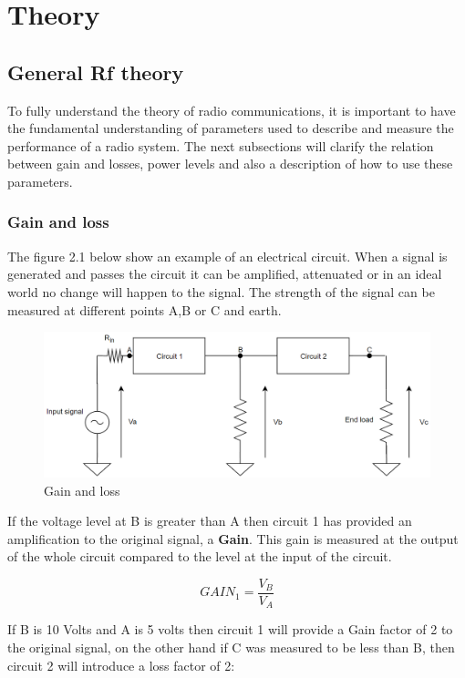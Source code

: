 \chapter{Theory}

\section{General Rf theory}
To fully understand the theory of radio communications, it is important to have the fundamental understanding of parameters used to describe and measure the performance of a radio system. The next subsections will clarify the relation between gain and losses, power levels and also a description of how to use these parameters.

\subsection{Gain and loss}
The figure 2.1 below show an example of an electrical circuit. When a signal is generated and passes the circuit it can be amplified, attenuated or in an ideal world no change will happen to the signal. The strength of the signal can be measured at different points A,B or C and earth. 

\begin{figure}[h]
\centering
\includegraphics[scale=0.5]{figures/GainLoss.PNG}
\caption{Gain and loss}
\end{figure}

If the voltage level at B is greater than A then circuit 1 has provided an amplification to the original signal, a \textbf{Gain}. This gain is measured at the output of the whole circuit compared to the level at the input of the circuit.

$$GAIN_1 = \frac{V_B}{V_A}$$

If B is 10 Volts and A is 5 volts then circuit 1 will provide a Gain factor of 2 to the original signal, on the other hand if C was measured to be less than B, then circuit 2 will introduce a loss factor of 2:

